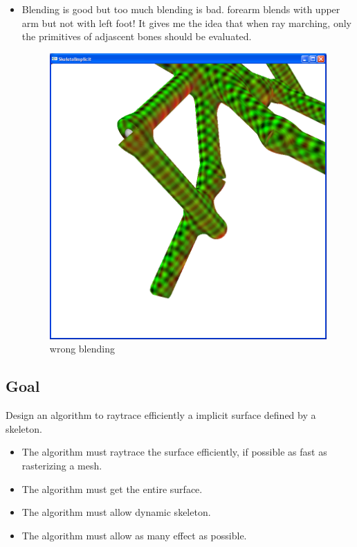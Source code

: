 \documentclass[11pt]{article}
\numberwithin{figure}{section}
\begin{document}
\begin{itemize}

\item{} Blending is good but too much blending is bad. forearm blends with upper arm but not with left foot! It gives me the idea that when ray marching, only the primitives of adjascent bones should be evaluated.
\begin{figure}[!h!]
\centering
\includegraphics[scale=0.3]{../pictures/wrongblend.png}
\caption{wrong blending}
\label{bilb}
\end{figure}

\end{itemize}



\subsection{Goal}

Design an algorithm to raytrace efficiently a implicit surface defined by a skeleton.
\begin{itemize}

\item{} The algorithm must raytrace the surface efficiently, if possible as fast as rasterizing a mesh.
\item The algorithm must get the entire surface.
\item The algorithm must allow dynamic skeleton.
\item The algorithm must allow as many effect as possible.

\end{itemize}
\end{document}
